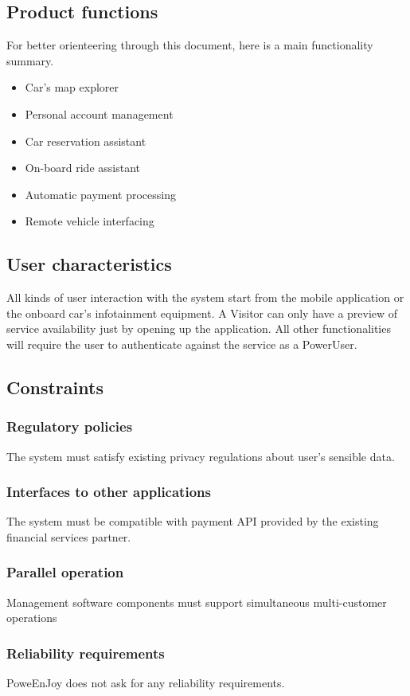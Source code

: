 \subsection{Product functions}
For better orienteering through this document, here is a main functionality summary.
\begin{itemize}
\item Car's map explorer
\item Personal account management
\item Car reservation assistant
\item On-board ride assistant
\item Automatic payment processing
\item Remote vehicle interfacing
\end{itemize}
\subsection{User characteristics}
All kinds of user interaction with the system start from the mobile application or the onboard car's infotainment equipment. A Visitor can only have a preview of service availability just by opening up the application. All other functionalities will require the user to authenticate against the service as a PowerUser.
\subsection{Constraints}
\subsubsection{Regulatory policies}
The system must satisfy existing privacy regulations about user's sensible data.
\subsubsection{Interfaces to other applications}
The system must be compatible with payment API provided by the existing financial services partner.
\subsubsection{Parallel operation}
Management software components must support simultaneous multi-customer operations 
\subsubsection{Reliability requirements}
PoweEnJoy does not ask for any reliability requirements.
